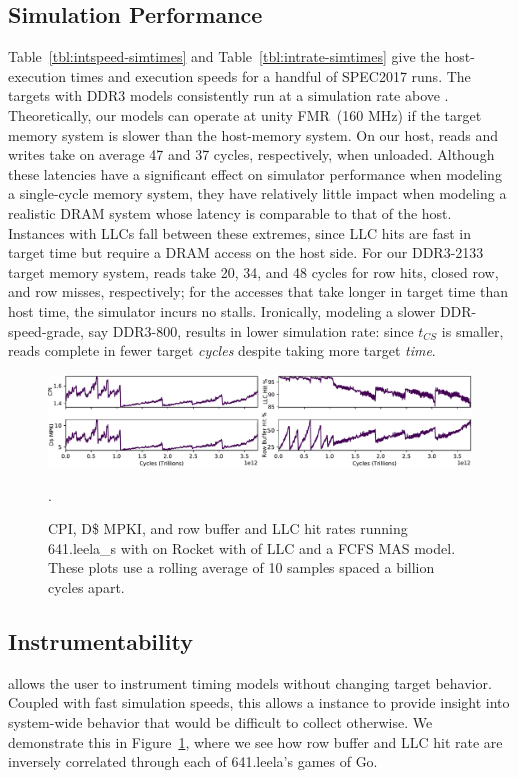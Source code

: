 \subsection{Simulation Performance}



Table~\ref{tbl:intspeed-simtimes} and Table~\ref{tbl:intrate-simtimes} give the
host-execution times and execution speeds for a handful of SPEC2017 runs. The
targets with DDR3 models consistently run at a simulation rate above . Theoretically,
our models can operate at unity FMR~(160 MHz) if the target memory system is
slower than the host-memory system. On our host, reads and writes take on average 47
and 37 cycles, respectively, when unloaded.  Although these latencies have
a significant effect on simulator performance when modeling a single-cycle memory
system, they have relatively little impact when modeling a realistic DRAM system
whose latency is comparable to that of the host.
Instances with LLCs fall between these extremes, since LLC hits are fast
in target time but require a DRAM access on the host side.
For our DDR3-2133
target memory system, reads take 20, 34, and 48 cycles for row hits, closed
row, and row misses, respectively; for the accesses that take longer in
target time than host time, the simulator incurs no stalls.  Ironically,
modeling a slower DDR-speed-grade, say DDR3-800, results in lower simulation
rate: since $t_{CS}$ is smaller, reads complete in fewer target \emph{cycles}
despite taking more target \emph{time}.

\begin{figure}
    \centering
    \includegraphics[width=\textwidth]{figures/leela-time-series.pdf}
    \caption{CPI, D\$ MPKI, and row buffer and LLC hit rates running
    641.leela\_s with on Rocket with  of LLC and a FCFS MAS
    model. These plots use a rolling average of 10 samples spaced a billion
    cycles apart.}.
    \label{fig:leela-time-series}
\vspace{-0.1in}
\end{figure}

\subsection{Instrumentability}
\PNAME allows the user to instrument timing models without changing target
behavior. Coupled with fast simulation speeds, this allows a \PNAME instance to
provide insight into system-wide behavior that would be difficult to collect
otherwise. We demonstrate this in Figure~\ref{fig:leela-time-series}, where we
see how row buffer and LLC hit rate are inversely correlated through each of
641.leela's games of Go.
